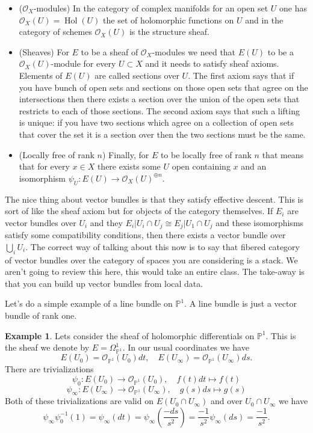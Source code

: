 \documentclass[12pt]{book}
\numberwithin{equation}{section}
\theoremstyle{definition}
\newtheorem{example}[theorem]{Example}
\theoremstyle{remark}
\newcommand{\PP}{\mathbb{P}}
\newcommand{\Ocal}{\mathcal{O}}
\newcommand{\hol}{\operatorname{Hol}}
\begin{document}
\begin{itemize} 
	\item ($\Ocal_X$-modules) 
	In the category of complex manifolds for an open set $U$ one has $\Ocal_X(U) = \hol(U)$ the set of holomorphic functions on $U$ and in the category of schemes $\Ocal_X(U)$ is the structure sheaf. 
	
	\item (Sheaves) For $E$ to be a sheaf of $\Ocal_X$-modules we need that $E(U)$ to be a $\Ocal_X(U)$-module for every $U\subset X$ and it needs to satisfy sheaf axioms. 
	Elements of $E(U)$ are called sections over $U$. 
	The first axiom says that if you have bunch of open sets and sections on those open sets that agree on the intersections then there exists a section over the union of the open sets that restricts to each of those sections. 
	The second axiom says that such a lifting is unique: if you have two sections which agree on a collection of open sets that cover the set it is a section over then the two sections must be the same. 
	\item (Locally free of rank $n$)
	Finally, for $E$ to be locally free of rank $n$ that means that for every $x\in X$ there exists some $U$ open containing $x$ and an isomorphism $\psi_U: E(U) \to \Ocal_X(U)^{\oplus n}$. 
\end{itemize}
The nice thing about vector bundles is that they satisfy effective descent. 
This is sort of like the sheaf axiom but for objects of the category themselves. 
If $E_i$ are vector bundles over $U_i$ and they $E_i \vert U_i \cap U_j \cong E_j \vert U_1 \cap U_j$ and these isomorphisms satisfy some compatibility conditions, then there exists a vector bundle over $\bigcup_{i} U_i$.
The correct way of talking about this now is to say that fibered category of vector bundles over the category of spaces you are considering is a stack. 
We aren't going to review this here, this would take an entire class. 
The take-away is that you can build up vector bundles from local data.

Let's do a simple example of a line bundle on $\PP^1$.
A line bundle is just a vector bundle of rank one. 
\begin{example}
	Lets consider the sheaf of holomorphic differentials on $\PP^1$. 
	This is the sheaf we denote by $E = \Omega_{\PP^1}^1$. 
	In our usual coordinates we have 
	$$ E(U_0) = \Ocal_{\PP^1}(U_0) dt, \quad E(U_{\infty}) = \Ocal_{\PP^1}(U_{\infty})ds.$$
	There are trivializations 
	$$ \psi_0\colon E(U_0) \to \Ocal_{\PP^1}(U_0), \quad f(t) dt \mapsto f(t) $$
	$$ \psi_{\infty} \colon E(U_{\infty}) \to \Ocal_{\PP^1}(U_{\infty}), \quad g(s)ds \mapsto g(s) $$
	Both of these trivializations are valid on $E(U_0 \cap U_{\infty})$ and over $U_0\cap U_{\infty}$ we have
	$$ \psi_{\infty}\psi_0^{-1}(1) = \psi_{\infty}(dt) = \psi_{\infty}(\frac{-ds}{s^2}) = \frac{-1}{s^2}\psi_{\infty}(ds) = \frac{-1}{s^2}.$$
\end{example}
\end{document}
